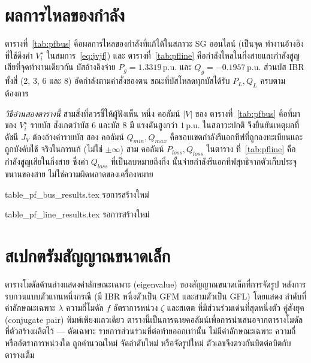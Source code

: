 \documentclass[12pt,a4paper]{article}
\newcommand{\pu}{\,\mathrm{p.u.}}
\begin{document}
\section{ผลการไหลของกำลัง}\label{sec:pf}
ตารางที่~\ref{tab:pfbus} คือผลการไหลของกำลังที่แก้ได้ในสภาวะ SG ออนไลน์ (เป็นจุด
ทำงานอ้างอิงที่ใช้ดึงค่า $V_i^{\star}$ ในสมการ~\eqref{eq:jvjf}) และ
ตารางที่~\ref{tab:pfline} คือกำลังไหลในกิ่งสายและกำลังสูญเสียที่จุดทำงานเดียวกัน
บัสอ้างอิงจ่าย $P_g=1.3319\pu$ และ $Q_g=-0.1957\pu$ ส่วนบัส IBR ทั้งสี่ (2, 3, 6
และ 8) อัดกำลังตามค่าสั่งของตน ขณะที่บัสโหลดทุกบัสได้รับ $P_L,Q_L$ ครบตามต้องการ

\emph{วิธีอ่านสองตารางนี้} สามสิ่งที่ควรชี้ให้ผู้ฟังเห็น หนึ่ง คอลัมน์ $|V|$ ของ
ตารางที่~\ref{tab:pfbus} คือที่มาของ $V_i^{\star}$ รายบัส สังเกตว่าบัส 6 และบัส 8 มี
แรงดันสูงกว่า $1\pu$ ในสภาวะปกติ จึงยืนยันเหตุผลที่ดัชนี $J_V$ ต้องอ้างค่ารายบัส
สอง คอลัมน์ $Q_{min},Q_{max}$ คือขอบเขตกำลังรีแอกทีฟที่ถูกลงทะเบียนและถูกบังคับใช้
จริงในการแก้ (ไม่ใช่ $\pm\infty$) สาม คอลัมน์ $P_{loss},Q_{loss}$ ในตาราง
ที่~\ref{tab:pfline} คือกำลังสูญเสียในกิ่งสาย ซึ่งค่า $Q_{loss}$ ที่เป็นลบหมายถึงกิ่ง
นั้นจ่ายกำลังรีแอกทีฟสุทธิจากตัวเก็บประจุขนานของสาย ไม่ใช่ความผิดพลาดของเครื่องหมาย

\begin{table}[H]
\centering\footnotesize
\caption{ผลการไหลของกำลังรายบัสที่จุดทำงาน SG ออนไลน์ (ค่าต่อหน่วยบนฐานระบบ
มุมเป็นองศา)}
\label{tab:pfbus}
 {}
 {\centering\ttfamily table\_pf\_bus\_results.tex รอการสร้างใหม่}
\end{table}

\begin{table}[H]
\centering\footnotesize
\caption{กำลังไหลในกิ่งสายและกำลังสูญเสียที่จุดทำงาน SG ออนไลน์}
\label{tab:pfline}
 {}
 {\centering\ttfamily table\_pf\_line\_results.tex รอการสร้างใหม่}
\end{table}

\section{สเปกตรัมสัญญาณขนาดเล็ก}\label{sec:sssa}
ตารางโมดัลด้านล่างแสดงค่าลักษณะเฉพาะ (eigenvalue) ของสัญญาณขนาดเล็กที่การจัดรูป
หลังการรบกวนแบบตัวแทนหนึ่งกรณี (มี IBR หนึ่งตัวเป็น GFM และสามตัวเป็น GFL) โดยแสดง
ลำดับที่ ค่าลักษณะเฉพาะ $\lambda$ ความถี่โมดัล $f$ อัตราการหน่วง $\zeta$ และสเตต
ที่มีส่วนร่วมเด่นที่สุดหนึ่งตัว คู่สังยุค (conjugate pair) พิมพ์เพียงแถวเดียว
ตารางนี้เป็นการฉายคอลัมน์เพื่อการนำเสนอจากตารางโมดัลที่ตัวสร้างผลิตไว้ --- ตัดเฉพาะ
รายการส่วนร่วมที่ต่อท้ายออกเท่านั้น ไม่มีค่าลักษณะเฉพาะ ความถี่ หรืออัตราการหน่วงใด
ถูกคำนวณใหม่ จัดลำดับใหม่ หรือจัดรูปใหม่ ตัวเลขจึงตรงกันบิตต่อบิตกับตารางเต็ม
\end{document}
